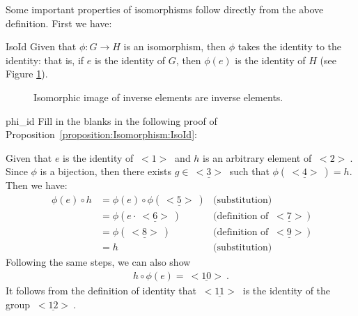 Some important properties of isomorphisms follow directly from the above definition. First we have:

\begin{prop}{IsoId}
Given that  $\phi : G \rightarrow H$ is an  isomorphism, then $\phi$ takes the identity to the identity: that is, if $e$ is the identity of $G$, then  $\phi(e)$ is the identity of $H$ (see Figure \ref{fig:Isomorphism:isomId}).
\end{prop}


\begin{figure}[htb]
	  \caption{\label{fig:Isomorphism:isomId} Isomorphic image of   inverse elements are  inverse elements. }
\end{figure}


\begin{exercise}{phi_id}
Fill in the blanks in the following proof of Proposition~\ref{proposition:Isomorphism:IsoId}:
\medskip

\noindent
Given that $e$ is the identity of \underline{$~<1>~$} and $h$ is an arbitrary element of \underline{$~<2>~$}.  Since $\phi$ is a bijection, then there exists $g \in \underline{~<3>~}$ such that $\phi(\underline{~<4>~}) = h$.  Then  we have:
\begin{align*}
\phi(e) \circ h &= \phi(e) \circ \phi(\underline{~<5>~}) & \textrm{(substitution)}\\
&= \phi( e \cdot \underline{~<6>~}) & \textrm{(definition of~} \underline{~<7>~})\\
&= \phi( \underline{~<8>~}) & \textrm{(definition of~} \underline{~<9>~})\\
&= h & \textrm{(substitution)}
\end{align*}
Following the same steps, we can also show
\begin{align*}
h \circ \phi(e) = \underline{~<10>~}.
\end{align*}
It follows from the definition of identity that $\underline{~<11>~}$ is the identity of the group $\underline{~<12>~}$.
\end{exercise}


